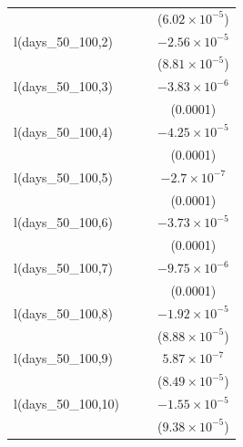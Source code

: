 \begin{tabular}{lccc}
                                    &          &                       & ($6.02\times 10^{-5}$)\\    
   l(days\_50\_100,2)               &          &                       & $-2.56\times 10^{-5}$\\    
                                    &          &                       & ($8.81\times 10^{-5}$)\\    
   l(days\_50\_100,3)               &          &                       & $-3.83\times 10^{-6}$\\    
                                    &          &                       & (0.0001)\\   
   l(days\_50\_100,4)               &          &                       & $-4.25\times 10^{-5}$\\    
                                    &          &                       & (0.0001)\\   
   l(days\_50\_100,5)               &          &                       & $-2.7\times 10^{-7}$\\    
                                    &          &                       & (0.0001)\\   
   l(days\_50\_100,6)               &          &                       & $-3.73\times 10^{-5}$\\    
                                    &          &                       & (0.0001)\\   
   l(days\_50\_100,7)               &          &                       & $-9.75\times 10^{-6}$\\    
                                    &          &                       & (0.0001)\\   
   l(days\_50\_100,8)               &          &                       & $-1.92\times 10^{-5}$\\    
                                    &          &                       & ($8.88\times 10^{-5}$)\\    
   l(days\_50\_100,9)               &          &                       & $5.87\times 10^{-7}$\\    
                                    &          &                       & ($8.49\times 10^{-5}$)\\    
   l(days\_50\_100,10)              &          &                       & $-1.55\times 10^{-5}$\\    
                                    &          &                       & ($9.38\times 10^{-5}$)\\    

\end{tabular}
